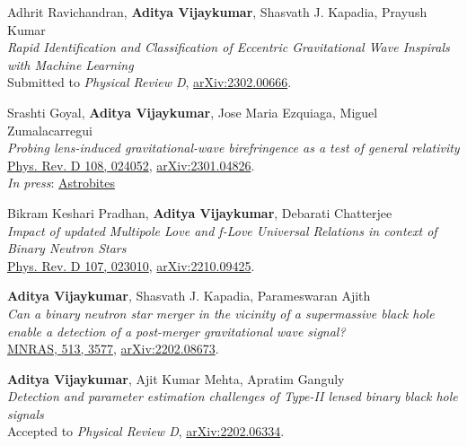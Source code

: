 \begin{etaremune}
	\item
	Adhrit Ravichandran, \textbf{Aditya Vijaykumar}, Shasvath J. Kapadia, Prayush Kumar  \\
	\textit{Rapid Identification and Classification of Eccentric Gravitational Wave Inspirals with Machine Learning}\\
	Submitted to \textit{Physical Review D}, \href{https://arxiv.org/abs/2302.00666}{arXiv:2302.00666}.
	
	\item
	Srashti Goyal, \textbf{Aditya Vijaykumar}, Jose Maria Ezquiaga, Miguel Zumalacarregui \\
	\textit{Probing lens-induced gravitational-wave birefringence as a test of general relativity}\\
	\href{https://journals.aps.org/prd/abstract/10.1103/PhysRevD.108.024052}{Phys. Rev. D 108, 024052}, \href{https://arxiv.org/abs/2301.04826}{arXiv:2301.04826}.\\
    \textit{In press}: \href{https://astrobites.org/2023/04/11/gravitational-waves-a-la-general-relativity-or-scrambled/}{Astrobites}


    \item 
	Bikram Keshari Pradhan, \textbf{Aditya Vijaykumar}, Debarati Chatterjee \\
	\textit{Impact of updated Multipole Love and f-Love Universal Relations in context of Binary Neutron Stars}\\
	\href{https://journals.aps.org/prd/abstract/10.1103/PhysRevD.107.023010}{Phys. Rev. D 107, 023010}, \href{https://arxiv.org/abs/2210.09425}{arXiv:2210.09425}.
 
 \item 
	\textbf{Aditya Vijaykumar}, Shasvath J. Kapadia, Parameswaran Ajith\\
	\textit{Can a binary neutron star merger in the vicinity of a supermassive black hole enable a detection of a post-merger gravitational wave signal?}\\
	\href{https://academic.oup.com/mnras/article/513/3/3577/6573885}{MNRAS, 513, 3577}, \href{https://arxiv.org/abs/2202.08673}{arXiv:2202.08673}.
	
	\item \textbf{Aditya Vijaykumar}, Ajit Kumar Mehta, Apratim Ganguly\\
	\textit{Detection and parameter estimation challenges of Type-II lensed binary black hole signals}\\
	Accepted to \textit{Physical Review D}, \href{https://arxiv.org/abs/2202.06334}{arXiv:2202.06334}.


\end{etaremune}
